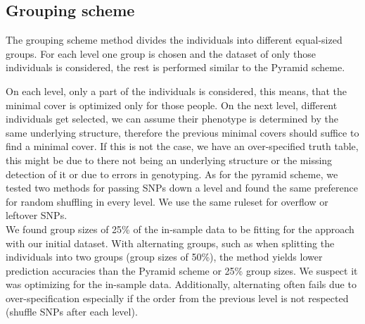 \documentclass[letterpaper, 11pt]{article}
\begin{document}
\subsection{Grouping scheme}
\begin{figure} [!h] 
\end{figure}
The grouping scheme method divides the individuals into different equal-sized groups. For each level one group is chosen and the dataset of only those individuals is considered, the rest is performed similar to the Pyramid scheme. 

On each level, only a part of the individuals is considered, this means, that the minimal cover is optimized only for those people. On the next level, different individuals get selected, we can assume their phenotype is determined by the same underlying structure, therefore the previous minimal covers should suffice to find a minimal cover. If this is not the case, we have an over-specified truth table, this might be due to there not being an underlying structure or the missing detection of it or due to errors in genotyping. 
As for the pyramid scheme, we tested two methods for passing SNPs down a level and found the same preference for random shuffling in every level.  We use the same ruleset for overflow or leftover SNPs. \\

We found group sizes of 25\% of the in-sample data to be fitting for the approach with our initial dataset. With alternating groups, such as when splitting the individuals into two groups (group sizes of 50\%), the method yields lower prediction accuracies than the Pyramid scheme or 25\% group sizes. We suspect it  was optimizing for the in-sample data. Additionally, alternating often fails due to over-specification especially if the order from the previous level is not respected (shuffle SNPs after each level).\\
\end{document}
